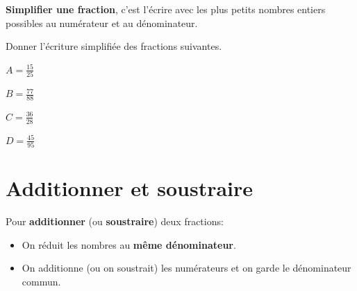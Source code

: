 \documentclass[a4paper]{book}
\begin{document}
    
    \begin{definition}[Simplification]
        \textbf{Simplifier une fraction}, c'est l'écrire avec les plus petits nombres entiers possibles au numérateur et au dénominateur.
    \end{definition}
        
        
    \begin{exemple}
        Donner l'écriture simplifiée des fractions suivantes.

        \begin{minipage}{0.24\linewidth}
            $A = \frac{15}{25}$

            \vspace{2cm}
        \end{minipage}
        \hfill\vline \hfill
        \begin{minipage}{0.24\linewidth}
            $B = \frac{77}{88}$

            \vspace{2cm}
        \end{minipage}
        \hfill\vline \hfill
        \begin{minipage}{0.24\linewidth}
            $C = \frac{36}{28}$        

            \vspace{2cm}
        \end{minipage}
        \hfill\vline \hfill
        \begin{minipage}{0.24\linewidth}
            $D = \frac{45}{95}$

            \vspace{2cm}
        \end{minipage}
    \end{exemple}
    
    
\section{Additionner et soustraire}
    
    \begin{propriete}
        Pour \textbf{additionner} (ou \textbf{soustraire}) deux fractions:
        \begin{itemize}
            \item On réduit les nombres au \textbf{même dénominateur}.
            \item On additionne (ou on soustrait) les numérateurs et on garde le dénominateur commun.
        \end{itemize}
    \end{propriete}
\end{document}
